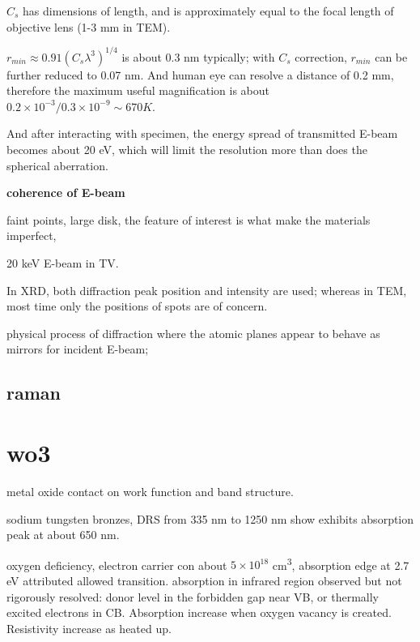 $C_s$ has dimensions of length, and is approximately equal to the focal length of objective lens (1-3 mm in TEM). 

$r_{min} \approx 0.91(C_s \lambda^3)^{1/4}$ is about 0.3 nm typically; with $C_s$ correction, $r_{min}$ can be further reduced to 0.07 nm. And human eye can resolve a distance of 0.2 mm, therefore the maximum useful magnification is about $0.2 \times 10^{-3}/0.3 \times 10^{-9} \sim 670 K$. 

And after interacting with specimen, the energy spread of transmitted E-beam becomes about 20 eV, which will limit the resolution more than does the spherical aberration. 

\textbf{coherence of E-beam}

faint points, large disk, the feature of interest is what make the materials imperfect, 

20 keV E-beam in TV. 

In XRD, both diffraction peak position and intensity are used; whereas in TEM, most time only the positions of spots are of concern. 

physical process of diffraction where the atomic planes appear to behave as mirrors for incident E-beam; 

\fi

\section{raman}


\iffalse
A Raman pattern database can be found at \url{http://wwwobs.univ-bpclermont.fr/sfmc/ramandb2/index.html}. 
In analytical practice, frequency is expressed in reciprocal wavelength (as cm−1), called wavenumbers;
\fi


\chapter{wo3}
metal oxide contact on work function and band structure.\cite{Greiner2013}

sodium tungsten bronzes, DRS from 335 nm to 1250 nm show  exhibits absorption peak at about 650 nm.\cite{Brown1954} 

oxygen deficiency, electron carrier con about $5\times10^{18}$ \si{cm^3}, absorption edge at 2.7 eV attributed allowed transition. absorption in infrared region observed but not rigorously resolved: donor level in the forbidden gap near VB, or thermally excited electrons in CB. Absorption increase when oxygen vacancy is created. Resistivity increase as heated up. \cite{Berak1970}


